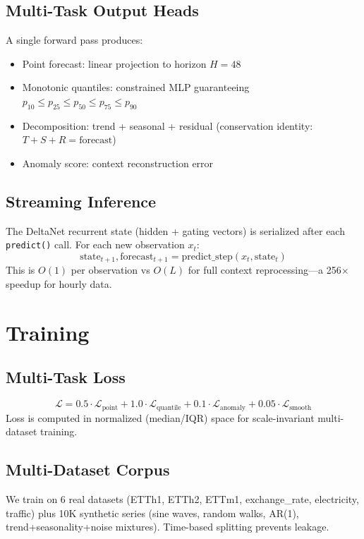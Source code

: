 \documentclass[11pt]{article}
\begin{document}
\subsection{Multi-Task Output Heads}
A single forward pass produces:
\begin{itemize}
    \item Point forecast: linear projection to horizon $H=48$
    \item Monotonic quantiles: constrained MLP guaranteeing $p_{10} \leq p_{25} \leq p_{50} \leq p_{75} \leq p_{90}$
    \item Decomposition: trend + seasonal + residual (conservation identity: $T + S + R = \text{forecast}$)
    \item Anomaly score: context reconstruction error
\end{itemize}

\subsection{Streaming Inference}
The DeltaNet recurrent state (hidden + gating vectors) is serialized after each \texttt{predict()} call. For each new observation $x_t$:
\begin{equation}
    \text{state}_{t+1}, \text{forecast}_{t+1} = \text{predict\_step}(x_t, \text{state}_t)
\end{equation}
This is $O(1)$ per observation vs $O(L)$ for full context reprocessing---a 256$\times$ speedup for hourly data.

\section{Training}

\subsection{Multi-Task Loss}
\begin{equation}
    \mathcal{L} = 0.5 \cdot \mathcal{L}_{\text{point}} + 1.0 \cdot \mathcal{L}_{\text{quantile}} + 0.1 \cdot \mathcal{L}_{\text{anomaly}} + 0.05 \cdot \mathcal{L}_{\text{smooth}}
\end{equation}
Loss is computed in normalized (median/IQR) space for scale-invariant multi-dataset training.

\subsection{Multi-Dataset Corpus}
We train on 6 real datasets (ETTh1, ETTh2, ETTm1, exchange\_rate, electricity, traffic) plus 10K synthetic series (sine waves, random walks, AR(1), trend+seasonality+noise mixtures). Time-based splitting prevents leakage.
\end{document}
